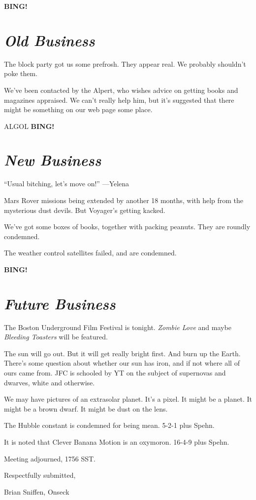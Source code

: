 \documentclass[10pt]{article}
\newcommand{\bing}{{\bf BING!} }
\newcommand{\goto}[1]{\bing \vskip 12pt \section*{{\em{#1}}}}
\newcommand{\ps}{ plus Spehn\xspace}
\begin{document}
\goto{Old Business}
The block party got us some prefrosh.  They appear real.  We probably
shouldn't poke them.

We've been contacted by the Alpert, who wishes advice on getting books
and magazines appraised.  We can't really help him, but it's suggested
that there might be something on our web page some place.

ALGOL
\goto{New Business}
``Usual bitching, let's move on!'' ---Yelena

Mars Rover missions being extended by another 18 months, with help
from the mysterious dust devils.  But Voyager's getting kacked.

We've got some boxes of books, together with packing peanuts.  They
are roundly condemned.

The weather control satellites failed, and are condemned.

\goto{Future Business}

The Boston Underground Film Festival is tonight.  \emph{Zombie Love}
and maybe \emph{Bleeding Toasters} will be featured.

The sun will go out.  But it will get really bright first.  And burn
up the Earth.  There's some question about whether our sun has iron,
and if not where all of ours came from.  JFC is schooled by YT on the
subject of supernovas and dwarves, white and otherwise.

We may have pictures of an extrasolar planet.  It's a pixel.  It might
be a planet.  It might be a brown dwarf.  It might be dust on the lens.

The Hubble constant is condemned for being mean. 5-2-1\ps.

It is noted that Clever Banana Motion is an oxymoron. 16-4-9\ps.

\vspace{12pt}

\noindent
Meeting adjourned, 1756 SST.

\vspace{18pt}

\centerline{Respectfully submitted,}
\centerline{Brian Sniffen, Onseck}
\end{document}
